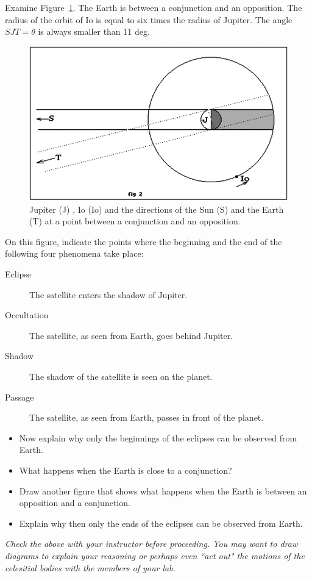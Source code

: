 \documentclass{tufte-handout}
\begin{document}
Examine Figure~\ref{fig:JupIo}. The Earth is between a conjunction and an opposition. The radius of the orbit of Io is equal to six times the radius of Jupiter. The angle $SJT = \theta$ is always smaller than 11 deg.
\begin{figure}
\includegraphics{RomerFig2.png}
\caption{Jupiter (J) , Io (Io) and the directions of the Sun (S) and the Earth (T) at a point between a conjunction and an opposition.}
\label{fig:JupIo}
\end{figure}
On this figure, indicate the points where the beginning and the end of the following four phenomena take place:
\begin{description}
\item[Eclipse] The satellite enters the shadow of Jupiter.
\item[Occultation] The satellite, as seen from Earth, goes behind Jupiter.
\item[Shadow] The shadow of the satellite is seen on the planet.
\item[Passage] The satellite, as seen from Earth, passes in front of the planet.
\end{description}

\begin{itemize}[itemsep=0pt,parsep=0pt,topsep=0pt,partopsep=0pt]
\item Now explain why only the beginnings of the eclipses can be observed from Earth.

\item What happens when the Earth is close to a conjunction?
\item Draw another figure that shows what happens when the Earth is between an opposition and a conjunction. 
\item Explain why then only the ends of the eclipses can be observed from Earth.
\end{itemize}
{\it Check the above with your instructor before proceeding. You may want to draw diagrams to explain 
your reasoning or perhaps even ``act out" the motions of the celesitial bodies with the members 
of your lab.}
\end{document}
